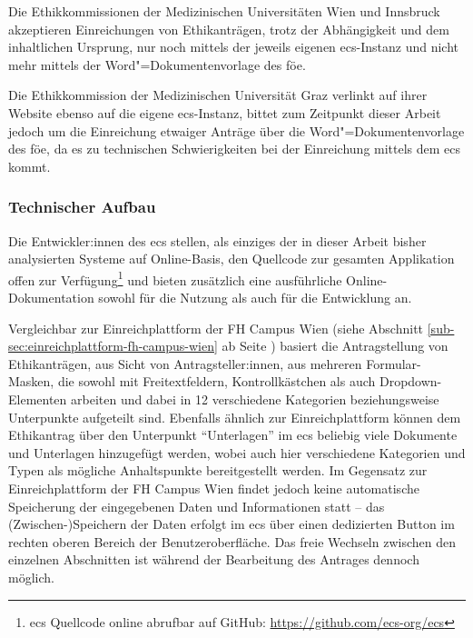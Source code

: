 \documentclass[a4paper,12pt,twoside]{scrreprt}
\begin{document}
Die Ethikkommissionen der Medizinischen Universitäten Wien und Innsbruck akzeptieren Einreichungen von Ethikanträgen, trotz der Abhängigkeit und dem inhaltlichen Ursprung, nur noch mittels der jeweils eigenen \ac{ecs}-Instanz und nicht mehr mittels der Word"=Dokumentenvorlage des \ac{föe}. \cite{ethikkommission_der_medizinischen_universitat_wien_ethik_2023, medizinische_universitat_innsbruck_einreichungen_2023}

Die Ethikkommission der Medizinischen Universität Graz verlinkt auf ihrer Website ebenso auf die eigene \ac{ecs}-Instanz, bittet zum Zeitpunkt dieser Arbeit jedoch um die Einreichung etwaiger Anträge über die Word"=Dokumentenvorlage des \ac{föe}, da es zu technischen Schwierigkeiten bei der Einreichung mittels dem \ac{ecs} kommt. \cite{medizinische_universitat_graz_ethikkommission_2023}

\subsubsection*{Technischer Aufbau}
\label{sub-sub-sec:ecs-technischer-aufbau}

Die Entwickler:innen des \acl{ecs} stellen, als einziges der in dieser Arbeit bisher analysierten Systeme auf Online-Basis, den Quellcode zur gesamten Applikation offen zur Verfügung\footnote{\ac{ecs} Quellcode online abrufbar auf GitHub: \url{https://github.com/ecs-org/ecs}} und bieten zusätzlich eine ausführliche Online-Dokumentation sowohl für die Nutzung als auch für die Entwicklung an. \cite{medizinische_universitat_wien_ecs-docs_about-2021, medizinische_universitat_wien_development_2021, medizinische_universitat_wien_installationusage_2021}

\medskip

Vergleichbar zur Einreichplattform der FH Campus Wien (siehe Abschnitt \ref{sub-sec:einreichplattform-fh-campus-wien} ab Seite \pageref{sub-sec:einreichplattform-fh-campus-wien}) basiert die Antragstellung von Ethikanträgen, aus Sicht von Antragsteller:innen, aus mehreren Formular-Masken, die sowohl mit Freitextfeldern, Kontrollkästchen als auch Dropdown-Elementen arbeiten und dabei in 12 verschiedene Kategorien beziehungsweise Unterpunkte aufgeteilt sind. Ebenfalls ähnlich zur Einreichplattform können dem Ethikantrag über den Unterpunkt \enquote{Unterlagen} im \ac{ecs} beliebig viele Dokumente und Unterlagen hinzugefügt werden, wobei auch hier verschiedene Kategorien und Typen als mögliche Anhaltspunkte bereitgestellt werden. Im Gegensatz zur Einreichplattform der FH Campus Wien findet jedoch keine automatische Speicherung der eingegebenen Daten und Informationen statt -- das (Zwischen-)Speichern der Daten erfolgt im \ac{ecs} über einen dedizierten Button im rechten oberen Bereich der Benutzeroberfläche. Das freie Wechseln zwischen den einzelnen Abschnitten ist während der Bearbeitung des Antrages dennoch möglich.
\end{document}
